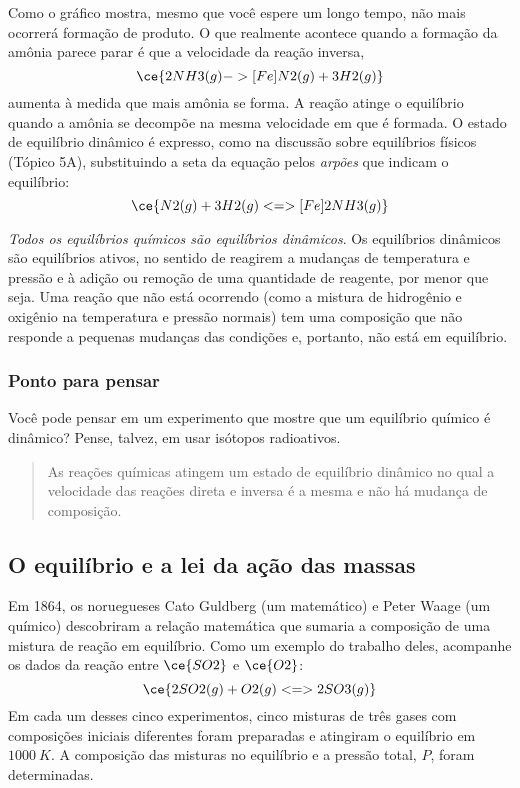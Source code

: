 Como o gráfico mostra, mesmo que você espere um longo tempo, não mais ocorrerá formação de produto. O que realmente acontece quando a formação da
amônia parece parar é que a velocidade da reação inversa, \[
    \ce{ 2 NH3(g) ->[Fe] N2(g) + 3 H2(g) }
\] aumenta à medida que mais amônia se forma. A reação atinge o equilíbrio quando a amônia se decompõe na mesma velocidade em que é formada. O estado
de equilíbrio dinâmico é expresso, como na discussão sobre equilíbrios físicos (Tópico 5A), substituindo a seta da equação pelos \emph{arpões} que
indicam o equilíbrio: \[
    \ce{ N2(g) + 3 H2(g) <=>[Fe] 2 NH3(g) }
\]

\emph{Todos os equilíbrios químicos são equilíbrios dinâmicos}. Os equilíbrios dinâmicos são equilíbrios ativos, no sentido de reagirem a mudanças de
temperatura e pressão e à adição ou remoção de uma quantidade de reagente, por menor que seja. Uma reação que não está ocorrendo (como a mistura de
hidrogênio e oxigênio na temperatura e pressão normais) tem uma composição que não responde a pequenas mudanças das condições e, portanto, não está em
equilíbrio.

\begin{think}

\subsubsection{Ponto para pensar}

Você pode pensar em um experimento que mostre que um equilíbrio químico é dinâmico? Pense, talvez, em usar isótopos radioativos.

\end{think}

\begin{quote}
As reações químicas atingem um estado de equilíbrio dinâmico no qual a velocidade das reações direta e inversa é a mesma e não há mudança de
composição.
\end{quote}

\subsection{O equilíbrio e a lei da ação das massas}

Em 1864, os noruegueses Cato Guldberg (um matemático) e Peter Waage (um químico) descobriram a relação matemática que sumaria a composição de uma
mistura de reação em equilíbrio. Como um exemplo do trabalho deles, acompanhe os dados da reação entre \(\ce{SO2}\) e \(\ce{O2}\): \[
    \ce{ 2 SO2(g) + O2(g) <=> 2 SO3(g) }
\] Em cada um desses cinco experimentos, cinco misturas de três gases com composições iniciais diferentes foram preparadas e atingiram o equilíbrio em
\(\qty{1000}{\unit{K}}\). A composição das misturas no equilíbrio e a pressão total, \(P\), foram determinadas.

